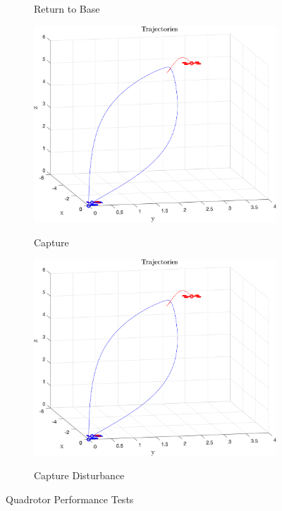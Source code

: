 \documentclass{article}
\begin{document}
\begin{multicols}{2}
\begin{figure}[H]
\begin{subfigure}[b]{0.45\columnwidth}
      \caption{Return to Base}
 \end{subfigure}
\begin{subfigure}[b]{0.45\columnwidth}
    \centering
    \includegraphics[width = 1\textwidth]{images/Intercept.png}
     \label{fig:Capture}
     \vspace{-5mm}
     \caption{Capture}
 \end{subfigure}
 \begin{subfigure}[b]{0.45\columnwidth}
    \centering
    \includegraphics[width = 1\textwidth]{images/Intercept.png}
     \label{fig:CaptureW}
     \vspace{-5mm}
     \caption{Capture Disturbance}
 \end{subfigure}
   \caption{Quadrotor Performance Tests}
\end{figure}


\end{multicols}
\end{document}
